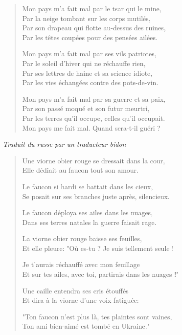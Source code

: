 \documentclass[french]{article}
\theoremstyle{definition}
\theoremstyle{remark}
\begin{document}
\begin{verse}
Mon pays m'a fait mal par le tsar qui le mine,\\
Par la neige tombant sur les corps mutilés,\\
Par son drapeau qui flotte au-dessus des ruines,\\
Par les têtes coupées pour des pensées ailées.

Mon pays m'a fait mal par ses vils patriotes,\\
Par le soleil d'hiver qui ne réchauffe rien,\\
Par ses lettres de haine et sa science idiote,\\
Par les vies échangées contre des pots-de-vin.

Mon pays m'a fait mal par sa guerre et sa paix,\\
Par son passé moqué et son futur meurtri,\\
Par les terres qu'il occupe, celles qu'il occupait.\\
Mon pays me fait mal. Quand sera-t-il guéri ?
\end{verse}


\emph{Traduit du russe par un traducteur bidon}

\begin{verse}
Une viorne obier rouge se dressait dans la cour,\\
Elle dédiait au faucon tout son amour.

Le faucon si hardi se battait dans les cieux,\\
Se posait sur ses branches juste après, silencieux.

Le faucon déploya ses ailes dans les nuages,\\
Dans ses terres natales la guerre faisait rage.

La viorne obier rouge baisse ses feuilles,\\
Et elle pleure: "Où es-tu ? Je suis tellement seule !

Je t'aurais réchauffé avec mon feuillage\\
Et sur tes ailes, avec toi, partirais dans les nuages !"

Une caille entendra ses cris étouffés\\
Et dira à la viorne d'une voix fatiguée:

"Ton faucon n'est plus là, tes plaintes sont vaines,\\
Ton ami bien-aimé est tombé en Ukraine."
\end{verse}
\end{document}
